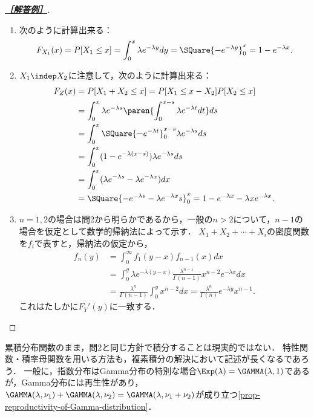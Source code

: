 \documentclass[uplatex,dvipdfmx]{jsarticle}
\begin{document}
\begin{proof}[\textbf{\underline{［解答例］}}]\mbox{}
    \begin{enumerate}
        \item 次のように計算出来る：
        \[F_{X_1}(x)=P[X_1\le x]=\int^x_0\lambda e^{-\lambda y}dy=\SQuare{-e^{-\lambda y}}^x_0=1-e^{-\lambda x}.\]
        \item $X_1\indep X_2$に注意して，次のように計算出来る：
        \begin{align*}
            F_{Z}(x)&=P[X_1+X_2\le x]=P[X_1\le x-X_2]P[X_2\le x]\\
            &=\int^x_0\lambda e^{-\lambda s}\paren{\int^{x-s}_0\lambda e^{-\lambda t}dt}ds\\
            &=\int^x_0\SQuare{-e^{-\lambda t}}^{x-s}_0\lambda e^{-\lambda s}ds\\
            &=\int^x_0(1-e^{-\lambda(x-s)})\lambda e^{-\lambda s}ds\\
            &=\int^x_0(\lambda e^{-\lambda s}-\lambda e^{-\lambda x})dx\\
            &=\SQuare{-e^{-\lambda s}-\lambda e^{-\lambda x}s}^x_0=1-e^{-\lambda x}-\lambda xe^{-\lambda x}.
        \end{align*}
        \item $n=1,2$の場合は問2から明らかであるから，一般の$n>2$について，$n-1$の場合を仮定として数学的帰納法によって示す．
        $X_1+X_2+\cdots+X_i$の密度関数を$f_i$で表すと，帰納法の仮定から，
        \begin{align*}
            f_n(y)&=\int^\infty_0f_1(y-x)f_{n-1}(x)dx\\
            &=\int^y_0\lambda e^{-\lambda(y-x)}\frac{\lambda^{n-1}}{\Gamma(n-1)}x^{n-2}e^{-\lambda x}dx\\
            &=\frac{\lambda^n}{\Gamma(n-1)}\int^y_0x^{n-2}dx=\frac{\lambda^n}{\Gamma(n)}e^{-\lambda y}x^{n-1}.
        \end{align*}
        これはたしかに$F_Y'(y)$に一致する．
    \end{enumerate}
\end{proof}
\begin{remark*}
    累積分布関数のまま，問2と同じ方針で積分することは現実的ではない．
    特性関数・積率母関数を用いる方法も，複素積分の解決において記述が長くなるであろう．
    一般に，指数分布はGamma分布の特別な場合$\Exp(\lambda)=\GAMMA(\lambda,1)$であるが，Gamma分布には再生性があり，
    $\GAMMA(\lambda,\nu_1)+\GAMMA(\lambda,\nu_2)=\GAMMA(\lambda,\nu_1+\nu_2)$が成り立つ\ref{prop-reproductivity-of-Gamma-distribution}．
\end{remark*}
\end{document}

